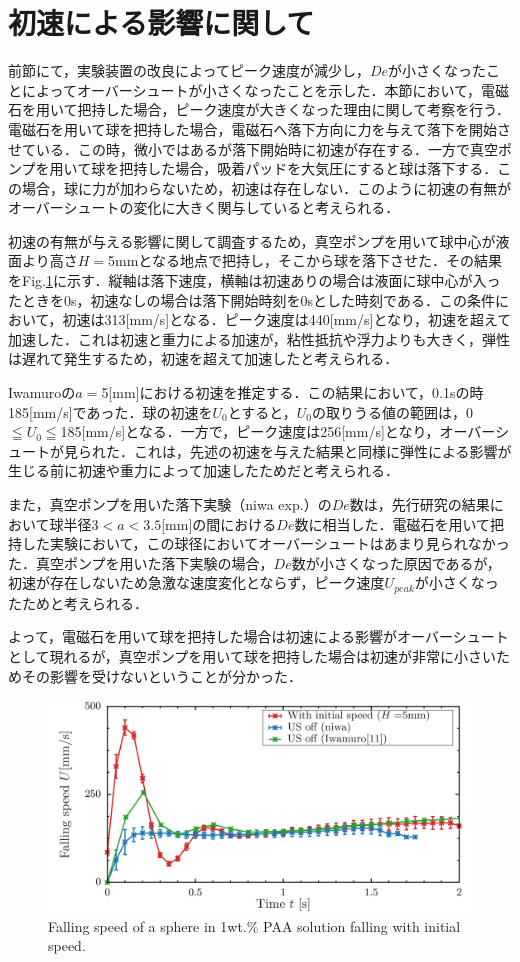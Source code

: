 \clearpage

\section{初速による影響に関して}

前節にて，実験装置の改良によってピーク速度が減少し，$De$が小さくなったことによってオーバーシュートが小さくなったことを示した．本節において，電磁石を用いて把持した場合，ピーク速度が大きくなった理由に関して考察を行う．電磁石を用いて球を把持した場合，電磁石へ落下方向に力を与えて落下を開始させている．この時，微小ではあるが落下開始時に初速が存在する．一方で真空ポンプを用いて球を把持した場合，吸着パッドを大気圧にすると球は落下する．この場合，球に力が加わらないため，初速は存在しない．このように初速の有無がオーバーシュートの変化に大きく関与していると考えられる．

初速の有無が与える影響に関して調査するため，真空ポンプを用いて球中心が液面より高さ$H=$5mmとなる地点で把持し，そこから球を落下させた．その結果をFig.\ref{fig:h-5}に示す．縦軸は落下速度，横軸は初速ありの場合は液面に球中心が入ったときを0s，初速なしの場合は落下開始時刻を0sとした時刻である．この条件において，初速は313[mm/s]となる．ピーク速度は440[mm/s]となり，初速を超えて加速した．これは初速と重力による加速が，粘性抵抗や浮力よりも大きく，弾性は遅れて発生するため，初速を超えて加速したと考えられる．

Iwamuro\cite{ref:9}の$a =$5[mm]における初速を推定する．この結果において，0.1sの時185[mm/s]であった．球の初速を$U_0$とすると，$U_0$の取りうる値の範囲は，0$\leqq U_0 \leqq$185[mm/s]となる．一方で，ピーク速度は256[mm/s]となり，オーバーシュートが見られた．これは，先述の初速を与えた結果と同様に弾性による影響が生じる前に初速や重力によって加速したためだと考えられる．

また，真空ポンプを用いた落下実験（niwa exp.）の$De$数は，先行研究の結果において球半径$3<a<3.5$[mm]の間における$De$数に相当した．電磁石を用いて把持した実験において，この球径においてオーバーシュートはあまり見られなかった．真空ポンプを用いた落下実験の場合，$De$数が小さくなった原因であるが，初速が存在しないため急激な速度変化とならず，ピーク速度$U_{peak}$が小さくなったためと考えられる．

よって，電磁石を用いて球を把持した場合は初速による影響がオーバーシュートとして現れるが，真空ポンプを用いて球を把持した場合は初速が非常に小さいためその影響を受けないということが分かった．

\begin{figure}[ht]
    \begin{center}
        \includegraphics[width=15cm,clip]{5-Results/h-5.png}
        \caption{Falling speed of a sphere in 1wt.\% PAA solution falling with initial speed.}
        \label{fig:h-5}
    \end{center}
\end{figure}